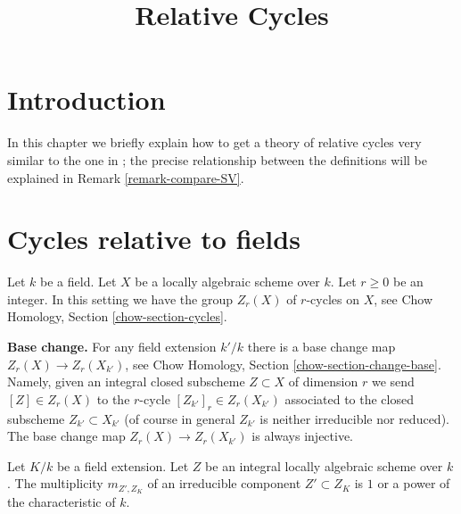 

%


\title{Relative Cycles}


\maketitle

\label{section-phantom}

\tableofcontents



\section{Introduction}
\label{section-introduction}

\noindent
In this chapter we briefly explain how to get a theory of relative cycles
very similar to the one in \cite{SV}; the precise relationship between the
definitions will be explained in Remark \ref{remark-compare-SV}.



\section{Cycles relative to fields}
\label{section-relative-fields}

\noindent
Let $k$ be a field. Let $X$ be a locally algebraic scheme over $k$.
Let $r \geq 0$ be an integer. In this setting we have the group
$Z_r(X)$ of $r$-cycles on $X$, see
Chow Homology, Section \ref{chow-section-cycles}.

\medskip\noindent
{\bf Base change.} For any field extension $k'/k$ there is a base change
map $Z_r(X) \to Z_r(X_{k'})$, see
Chow Homology, Section \ref{chow-section-change-base}.
Namely, given an integral closed subscheme $Z \subset X$
of dimension $r$ we send $[Z] \in Z_r(X)$ to the $r$-cycle
$[Z_{k'}]_r \in Z_r(X_{k'})$ associated to the closed subscheme
$Z_{k'} \subset X_{k'}$ (of course in general $Z_{k'}$
is neither irreducible nor reduced). The base change map
$Z_r(X) \to Z_r(X_{k'})$ is always injective.

\begin{lemma}
\label{lemma-multiplicities-field-extension}
Let $K/k$ be a field extension. Let $Z$ be an integral locally algebraic
scheme over $k$. The multiplicity $m_{Z', Z_K}$ of an irreducible
component $Z' \subset Z_K$ is $1$ or a power of the characteristic of $k$.
\end{lemma}

